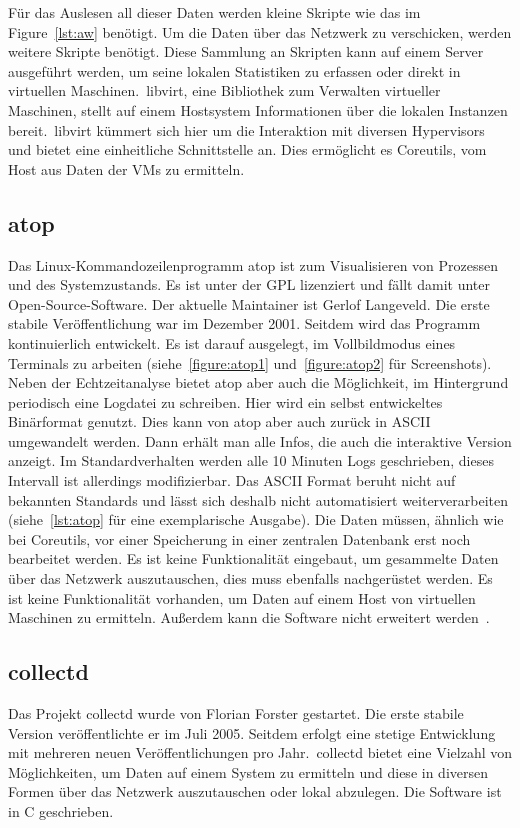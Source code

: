 Für das Auslesen all dieser Daten werden kleine Skripte wie das im
Figure~\ref{lst:aw} benötigt. Um die Daten über das Netzwerk zu verschicken,
werden weitere Skripte benötigt. Diese Sammlung an Skripten kann auf einem
Server ausgeführt werden, um seine lokalen Statistiken zu erfassen oder direkt
in virtuellen Maschinen.\ libvirt, eine Bibliothek zum Verwalten virtueller
Maschinen, stellt auf einem Hostsystem Informationen über die lokalen Instanzen
bereit.\ libvirt kümmert sich hier um die Interaktion mit diversen Hypervisors
und bietet eine einheitliche Schnittstelle an. Dies ermöglicht es Coreutils,
vom Host aus Daten der VMs zu ermitteln.
\tm%

\subsection{atop}
Das Linux-Kommandozeilenprogramm atop ist zum Visualisieren von Prozessen und
des Systemzustands. Es ist unter der GPL lizenziert und fällt damit unter
Open-Source-Software. Der aktuelle \gls{Maintainer} ist Gerlof Langeveld.  Die
erste stabile Veröffentlichung war im Dezember 2001. Seitdem wird das Programm
kontinuierlich entwickelt. Es ist darauf ausgelegt, im Vollbildmodus eines
Terminals zu arbeiten (siehe~\ref{figure:atop1} und~\ref{figure:atop2} für
Screenshots). Neben der Echtzeitanalyse bietet atop aber auch die Möglichkeit,
im Hintergrund periodisch eine Logdatei zu schreiben. Hier wird ein selbst
entwickeltes Binärformat genutzt. Dies kann von atop aber auch zurück in ASCII
umgewandelt werden. Dann erhält man alle Infos, die auch die interaktive
Version anzeigt. Im Standardverhalten werden alle 10 Minuten Logs geschrieben,
dieses Intervall ist allerdings modifizierbar. Das ASCII Format beruht nicht
auf bekannten Standards und lässt sich deshalb nicht automatisiert
weiterverarbeiten (siehe~\ref{lst:atop} für eine exemplarische Ausgabe). Die
Daten müssen, ähnlich wie bei Coreutils, vor einer Speicherung in einer
zentralen Datenbank erst noch bearbeitet werden. Es ist keine Funktionalität
eingebaut, um gesammelte Daten über das Netzwerk auszutauschen, dies muss
ebenfalls nachgerüstet werden. Es ist keine Funktionalität vorhanden, um Daten
auf einem Host von virtuellen Maschinen zu ermitteln. Außerdem kann die
Software nicht erweitert werden~\cite{atop}.
\tm%

\subsection{collectd}
Das Projekt collectd wurde von Florian Forster gestartet. Die erste stabile
Version veröffentlichte er im Juli 2005. Seitdem erfolgt eine stetige
Entwicklung mit mehreren neuen Veröffentlichungen pro Jahr.\ collectd bietet
eine Vielzahl von Möglichkeiten, um Daten auf einem System zu ermitteln und
diese in diversen Formen über das Netzwerk auszutauschen oder lokal abzulegen.
Die Software ist in C geschrieben.

